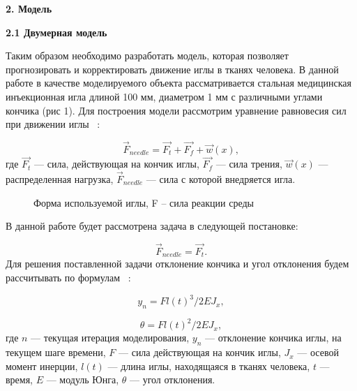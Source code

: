 \documentclass[10pt]{article}
\begin{document}
\bigskip
\textbf{2. Модель}

\bigskip
\textbf{2.1 Двумерная модель}

\bigskip
Таким образом необходимо разработать модель, которая позволяет прогнозировать и корректировать движение иглы в тканях человека.  В данной работе в качестве моделируемого объекта рассматривается стальная медицинская инъекционная игла длиной 100 мм, диаметром 1 мм с различными углами кончика (рис 1).
Для построения модели рассмотрим  уравнение равновесия сил при движении иглы ~\cite{Model}: 

\begin{equation} \label{eq1}
\Vec{F}_{needle} = \Vec{F_{t}} + \Vec{F_{f}} + \Vec{w}(x),
\end{equation}
где $\Vec{F_{t}}$ --- сила, действующая на кончик иглы, $\Vec{F_{f}}$ --- сила трения, $\Vec{w}(x)$ --- распределенная нагрузка, $\Vec{F}_{needle}$ --- сила с которой внедряется игла.

\begin{figure}[h]
\caption{Форма используемой иглы, F – сила реакции среды}
\label{fig:n1}
\end{figure}

В данной работе будет рассмотрена  задача в следующей постановке:

\begin{equation} \label{eq2}
\Vec{F}_{needle} = \Vec{F_{t}}.
\end{equation}
Для решения поставленной задачи отклонение кончика и угол отклонения будем рассчитывать по формулам ~\cite{Model}:

\begin{equation} \label{eq3}
y_{n} = Fl(t)^3 / 2EJ_{x},
\end{equation}

\begin{equation} \label{eq4}
\theta = Fl(t)^2 / 2EJ_{x},
\end{equation}
где $n$ --- текущая итерация моделирования, $y_{n}$ --- отклонение кончика иглы, на текущем шаге времени,
$F$ --- сила действующая на кончик иглы, $J_{x}$ --- осевой момент инерции, 
$l(t)$ --- длина иглы, находящаяся в тканях человека, $t$ --- время, $E$ --- модуль Юнга, $\theta$ --- угол отклонения.
\end{document}
